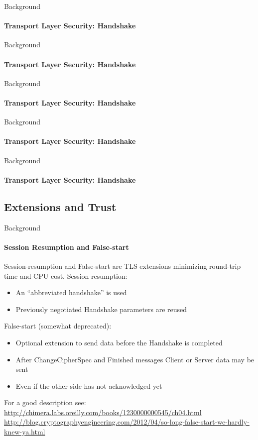 \documentclass[hyperref={draft}]{beamer}
\begin{document}
\begin{frame}{Background}
  \framesubtitle{Transport Layer Security: Handshake}
  \fontsize{9}{7}\selectfont{}
\end{frame}

\begin{frame}{Background}
  \framesubtitle{Transport Layer Security: Handshake}
  \fontsize{9}{7}\selectfont{}
\end{frame}

\begin{frame}{Background}
  \framesubtitle{Transport Layer Security: Handshake}
  \fontsize{9}{7}\selectfont{}
\end{frame}

\begin{frame}{Background}
  \framesubtitle{Transport Layer Security: Handshake}
  \fontsize{9}{7}\selectfont{}
\end{frame}

\begin{frame}{Background}
  \framesubtitle{Transport Layer Security: Handshake}
  \fontsize{9}{7}\selectfont{}
\end{frame}

\subsection{Extensions and Trust}

\begin{frame}{Background}
  \framesubtitle{Session Resumption and False-start}
  Session-resumption and False-start are TLS extensions minimizing round-trip time and CPU cost.
  \newline
  \newline
  Session-resumption:
  \begin{itemize}
    \item An ``abbreviated handshake'' is used
    \item Previously negotiated Handshake parameters are reused
  \end{itemize}
  False-start (somewhat deprecated):
  \begin{itemize}
    \item Optional extension to send data before the Handshake is completed
    \item After ChangeCipherSpec and Finished messages Client or Server data may be sent
    \item Even if the other side has not acknowledged yet
  \end{itemize}

  \tiny
  For a good description see: \url{http://chimera.labs.oreilly.com/books/1230000000545/ch04.html}\\
  \url{http://blog.cryptographyengineering.com/2012/04/so-long-false-start-we-hardly-knew-ya.html}
\end{frame}
\end{document}

